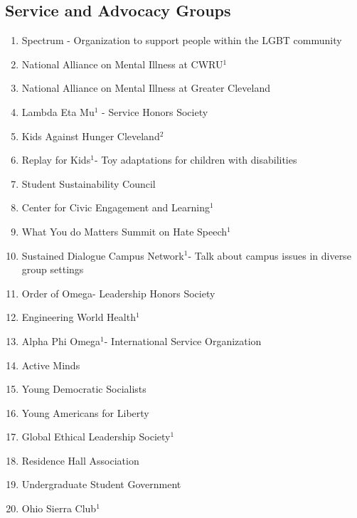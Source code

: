     \subsection*{Service and Advocacy Groups}
      \begin{enumerate}
      	\item Spectrum - Organization to support people within the LGBT community
      	
	\item National Alliance on Mental Illness at CWRU$^1$
	
	\item National Alliance on Mental Illness at Greater Cleveland
	
	\item Lambda Eta Mu$^1$ - Service Honors Society
	
	\item Kids Against Hunger Cleveland$^2$
	
	\item Replay for Kids$^1$- Toy adaptations for children with disabilities
	
	\item Student Sustainability Council
	
	\item Center for Civic Engagement and Learning$^1$
	
	\item What You do Matters Summit on Hate Speech$^1$
	
	\item Sustained Dialogue Campus Network$^1$- Talk about campus issues in diverse group settings
	
	\item Order of Omega- Leadership Honors Society
	
	\item Engineering World Health$^1$
	
	\item Alpha Phi Omega$^1$- International Service Organization
	
	\item Active Minds
	
	\item Young Democratic Socialists
	
	\item Young Americans for Liberty
	
	\item Global Ethical Leadership Society$^1$
	
	\item Residence Hall Association
	
	\item Undergraduate Student Government
	
	\item Ohio Sierra Club$^1$
      \end{enumerate}
      

